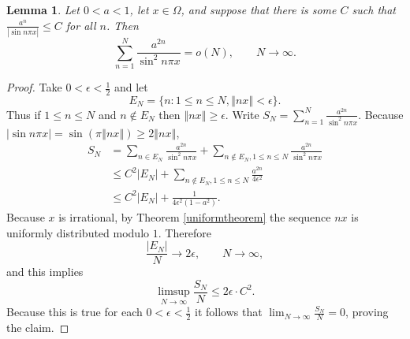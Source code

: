 \documentclass{article}
\newcommand{\norm}[1]{\left\Vert #1 \right\Vert}
\newtheorem{lemma}[theorem]{Lemma}
\begin{document}
\begin{lemma}
Let $0<a<1$, let $x \in \Omega$, and suppose that there is some $C$ such that
$\frac{a^n}{|\sin n\pi x|} \leq C$ for all $n$. Then
\[
\sum_{n=1}^N \frac{a^{2n}}{\sin^2 n \pi x} = o(N),\qquad N \to \infty.
\]
\label{axC}
\end{lemma}
\begin{proof}
Take $0<\epsilon<\frac{1}{2}$ and let
\[
E_N = \{n: 1 \leq n \leq N, \norm{nx}<\epsilon\}.
\]
Thus if $1 \leq n \leq N$ and $n \not \in E_N$ then $\norm{nx} \geq \epsilon$. 
Write $S_N=\sum_{n=1}^N \frac{a^{2n}}{\sin^2 n \pi x}$.
Because $|\sin n\pi x| =\sin(\pi \norm{nx}) \geq 2\norm{nx}$,
\begin{align*}
S_N&=\sum_{n \in E_N} \frac{a^{2n}}{\sin^2 n\pi x} + \sum_{n \not \in E_N, 1 \leq n \leq N} 
\frac{a^{2n}}{\sin^2 n \pi x}\\
&\leq C^2 |E_N| + \sum_{n \not \in E_N, 1 \leq n \leq N} \frac{a^{2n}}{4 \epsilon^2}\\
&\leq C^2 |E_N| + \frac{1}{4\epsilon^2(1-a^2)}. 
\end{align*}
Because $x$ is irrational, by Theorem \ref{uniformtheorem} the sequence $nx$ is uniformly distributed modulo $1$.
Therefore
\[
\frac{|E_N|}{N} \to 2\epsilon,\qquad N \to \infty,
\] 
and this implies
\[
\limsup_{N \to \infty} \frac{S_N}{N} \leq 2\epsilon \cdot C^2.
\]
Because this is true for each $0<\epsilon<\frac{1}{2}$ it follows that $\lim_{N \to \infty} \frac{S_N}{N} = 0$, proving the claim.
\end{proof}
\end{document}
